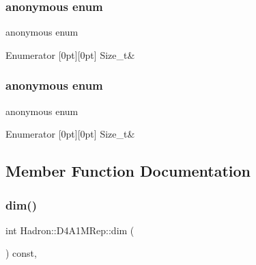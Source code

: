 \subsubsection{\texorpdfstring{anonymous enum}{anonymous enum}}
{\footnotesize\ttfamily anonymous enum}

\begin{DoxyEnumFields}{Enumerator}
[0pt][0pt]{}\mbox{\label{structHadron_1_1D4A1MRep_af7e02aaf91af1e86a79ac298138ee27caa0cd2661050a0a1980d0876c05923299}} 
Size\+\_\+t&\\
\hline

\end{DoxyEnumFields}
\mbox{\label{structHadron_1_1D4A1MRep_af7e02aaf91af1e86a79ac298138ee27c}} 
\subsubsection{\texorpdfstring{anonymous enum}{anonymous enum}}
{\footnotesize\ttfamily anonymous enum}

\begin{DoxyEnumFields}{Enumerator}
[0pt][0pt]{}\mbox{\label{structHadron_1_1D4A1MRep_af7e02aaf91af1e86a79ac298138ee27caa0cd2661050a0a1980d0876c05923299}} 
Size\+\_\+t&\\
\hline

\end{DoxyEnumFields}


\subsection{Member Function Documentation}
\mbox{\label{structHadron_1_1D4A1MRep_ae14f6a295b89553d56114e5727e631da}} 
\subsubsection{\texorpdfstring{dim()}{dim()}\hspace{0.1cm}{\footnotesize\ttfamily [1/2]}}
{\footnotesize\ttfamily int Hadron\+::\+D4\+A1\+M\+Rep\+::dim (\begin{DoxyParamCaption}{ }\end{DoxyParamCaption}) const\hspace{0.3cm}{\ttfamily [inline]}, {\ttfamily [virtual]}}

